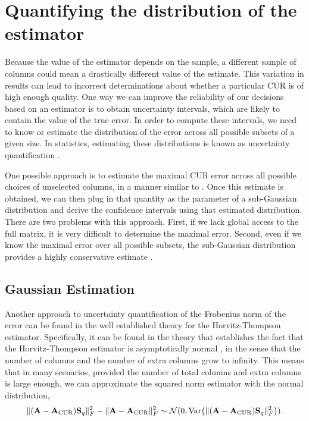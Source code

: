 \documentclass[11pt]{article}
\newcommand{\curX}{\mathbf{A}_{\textup{CUR}}}
\begin{document}
\section{Quantifying the distribution of the estimator} \label{sec:uq}
Because the value of the estimator depends on the sample, a different sample of columns could mean a drastically different value of the estimate.
This variation in results can lead to incorrect determinations about whether a particular CUR is of high enough quality.
One way we can improve the reliability of our decisions based on an estimator is to obtain uncertainty intervals, which are likely to contain the value of the true error.
In order to compute these intervals, we need to know or estimate the distribution of the error across all possible subsets of a given size.
In statistics, estimating these distributions is known as uncertainty quantification \cite{pritchard2023practical}.

One possible approach is to estimate the maximal CUR error across all possible choices of unselected columns, in a manner similar to \cite{pritchard2023practical}.
Once this estimate is obtained, we can then plug in that quantity as the parameter of a sub-Gaussian distribution and derive the confidence intervals using that estimated distribution.
There are two problems with this approach.
First, if we lack global access to the full matrix, it is very difficult to determine the maximal error.
Second, even if we know the maximal error over all possible subsets, the sub-Gaussian distribution provides a highly conservative estimate \cite{pritchard2024solving}.
\subsection{Gaussian Estimation}
Another approach to uncertainty quantification of the Frobenius norm of the error can be found in the well established theory for the Horvitz-Thompson estimator. Specifically, it can be found in the theory that establishes the fact that the Horvitz-Thompson estimator is asymptotically normal \cite{berger1998rate}, in the sense that the number of columns and the number of extra columns grow to infinity. This means that in many scenarios, provided the number of total columns and extra columns is large enough, we can approximate the squared norm estimator with the normal distribution,
\begin{equation}
    \|(\mathbf{A} - \curX)\mathbf{S}_q\|^2_F - \|\mathbf{A} - \curX\|^2_F  \sim \mathcal{N}(0, \operatorname{Var}\!\left(\|(\mathbf{A}-\curX)\mathbf{S}_q\|_F^2\right)).
\end{equation}
\end{document}

